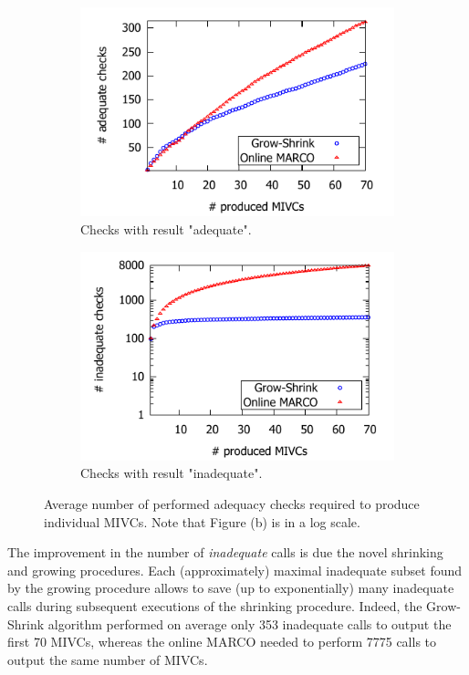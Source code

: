 \begin{figure}[!t]
\centering
\begin{subfigure}{.5\textwidth}
  \centering
  \includegraphics[scale=0.8]{./plots/adequate_checks_per_mivc_70.pdf}
  \caption{Checks with result "adequate".}
  \label{res:adequate_checks}
\end{subfigure}%
\begin{subfigure}{.5\textwidth}
  \centering
  \includegraphics[scale=0.8]{./plots/inadequate_checks_per_mivc_70.pdf}
  \caption{Checks with result "inadequate".}
  \label{res:inadequate_checks}
\end{subfigure}
\caption{Average number of performed adequacy checks required to produce individual MIVCs. Note that Figure (b) is in a log scale.}
\label{res:checks}
\end{figure}

The improvement in the number of \emph{inadequate} calls is due the novel shrinking and growing procedures.
Each (approximately) maximal inadequate subset found by the growing procedure allows to save (up to exponentially) many inadequate calls during subsequent executions of the shrinking procedure.
Indeed, the Grow-Shrink algorithm performed on average only 353 inadequate calls to output the first 70 MIVCs, whereas the online MARCO needed to perform 7775 calls to output the same number of MIVCs.

